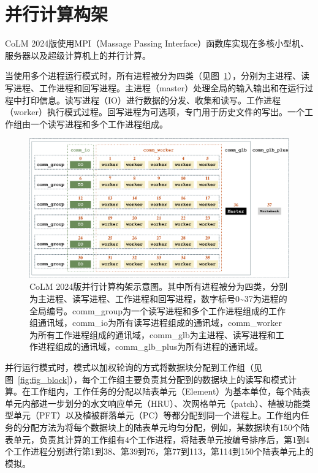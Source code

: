 \section{并行计算构架}\label{ch_parallel}

CoLM 2024版使用MPI（Massage Passing Interface）函数库实现在多核小型机、服务器以及超级计算机上的并行计算。

当使用多个进程运行模式时，所有进程被分为四类（见图~\ref{fig:fig_parallelization}），分别为主进程、读写进程、工作进程和回写进程。主进程（master）处理全局的输入输出和在运行过程中打印信息。读写进程（IO）进行数据的分发、收集和读写。工作进程（worker）执行模式过程。回写进程为可选项，专门用于历史文件的写出。一个工作组由一个读写进程和多个工作进程组成。

\begin{figure}[htpb]
    \centering
    \includegraphics[width=\textwidth]{figures/并行计算图.pdf}
    \caption{CoLM 2024版并行计算构架示意图。其中所有进程被分为四类，分别为主进程、读写进程、工作进程和回写进程，数字标号0\textasciitilde 37为进程的全局编号。comm\_group为一个读写进程和多个工作进程组成的工作组通讯域，comm\_io为所有读写进程组成的通讯域，comm\_worker为所有工作进程组成的通讯域，comm\_glb为主进程、读写进程和工作进程组成的通讯域，comm\_glb\_plus为所有进程的通讯域。}
    \label{fig:fig_parallelization}
\end{figure}

并行运行模式时，模式以加权轮询的方式将数据块分配到工作组（见图~\ref{fig:fig_block}），每个工作组主要负责其分配到的数据块上的读写和模式计算。在工作组内，工作任务的分配以陆表单元（Element）为基本单位，每个陆表单元内部进一步划分的水文响应单元（HRU）、次网格单元（patch）、植被功能类型单元（PFT）以及植被群落单元（PC）等都分配到同一个进程上。工作组内任务的分配方法为将每个数据块上的陆表单元均匀分配，例如，某数据块有150个陆表单元，负责其计算的工作组有4个工作进程，将陆表单元按编号排序后，第1到4个工作进程分别进行第1到38、第39到76，第77到113，第114到150个陆表单元上的模拟。

